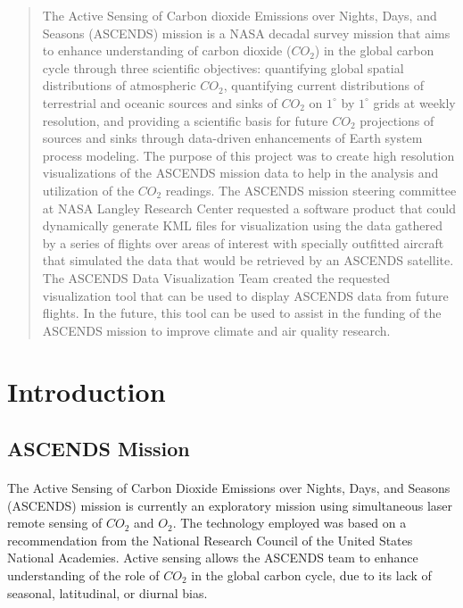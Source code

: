 \documentclass[12pt,letterpaper]{report}
\begin{document}
 

 \begin{abstract}
  The Active Sensing of Carbon dioxide Emissions over Nights, Days, and Seasons (ASCENDS) mission is a NASA decadal survey mission that aims to enhance understanding of carbon dioxide ($CO_2$) in the global carbon cycle through three scientific objectives: quantifying global spatial distributions of atmospheric $CO_2$, quantifying current distributions of terrestrial and oceanic sources and sinks of $CO_2$ on $1^\circ$ by $1^\circ$ grids at weekly resolution, and providing a scientific basis for future $CO_2$ projections of sources and sinks through data-driven enhancements of Earth system process modeling. The purpose of this project was to create high resolution visualizations of the ASCENDS mission data to help in the analysis and utilization of the $CO_2$ readings. The ASCENDS mission steering committee at NASA Langley Research Center requested a software product that could dynamically generate KML files for visualization using the data gathered by a series of flights over areas of interest with specially outfitted aircraft that simulated the data that would be retrieved by an ASCENDS satellite. The ASCENDS Data Visualization Team created the requested visualization tool that can be used to display ASCENDS data from future flights. In the future, this tool can be used to assist in the funding of the ASCENDS mission to improve climate and air quality research.
 \end{abstract}

 \section*{Introduction}
  \subsection*{ASCENDS Mission}
   \paragraph{}
    The Active Sensing of Carbon Dioxide Emissions over Nights, Days, and Seasons (ASCENDS) mission is currently an exploratory mission using simultaneous laser remote sensing of $CO_2$ and $O_2$. The technology employed was based on a recommendation from the National Research Council of the United States National Academies. Active sensing allows the ASCENDS team to enhance understanding of the role of $CO_2$ in the global carbon cycle, due to its lack of seasonal, latitudinal, or diurnal bias.
\end{document}
